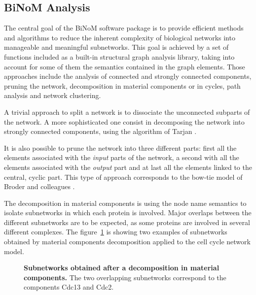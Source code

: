 \documentclass[10pt]{bmc_article}
\newenvironment{bmcformat}{\baselineskip20pt\sloppy\setboolean{publ}{false}}{\baselineskip20pt\sloppy}
\begin{document}
\begin{bmcformat}
\subsection*{BiNoM Analysis}
The central goal of the BiNoM software package is to provide efficient methods
and algorithms to reduce the inherent complexity of biological networks into
manageable and meaningful subnetworks. This goal is achieved by a set of
functions included as a built-in structural graph analysis library, taking into
account for some of them the semantics contained in the graph elements. Those
approaches include the analysis of connected and strongly connected components,
pruning the network, decomposition in material components or in cycles, path
analysis and network clustering.

A trivial approach to split a network is to dissociate the unconnected subparts
of the network. A more sophisticated one consist in decomposing the network into
strongly connected components, using the algorithm of Tarjan
\cite{tarjan1972depth}.

It is also possible to prune the network into three different parts:
first all the elements associated with the \emph{input} parts of the network, a
second with all the elements associated with the \emph{output} part and at last
all the elements linked to the central, cyclic part. This type of approach
corresponds to the bow-tie model of Broder and colleagues \cite{broder2000graph}.

The decomposition in material components is using the node name semantics to
isolate subnetworks in which each protein is involved. Major overlaps between
the different subnetworks are to be expected, as some proteins are involved in
several different complexes. The figure~\ref{matcdc2cdc13} is showing two examples of subnetworks
obtained by material components decomposition applied to the cell cycle network
model.
%
%

\begin{figure}[h]
 \caption{\label{matcdc2cdc13}  \textbf{Subnetworks obtained after a decomposition in
material components.} The two overlapping subnetworks correspond to the components Cdc13 and
Cdc2.}
\end{figure}



\end{bmcformat}
\end{document}
